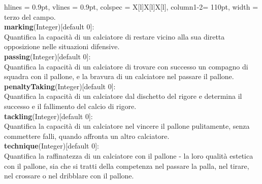 \begin{tblr}{
    hlines = {0.9pt}, vlines = {0.9pt}, colspec = {X[l]X[l]X[l]}, column{1-2}= {110pt},
    width = \textwidth
}
{			terzo del campo.\\
		\medskip\textbf{marking}(Integer)[default 0]:\\
			Quantifica la capacità di un calciatore
			di restare vicino alla sua diretta opposizione
			nelle situazioni difensive.\\
		\medskip\textbf{passing}(Integer)[default 0]:\\
			Quantifica la capacità di un calciatore di trovare
			con successo un compagno di squadra con il pallone,
			e la bravura di un calciatore nel passare il pallone.\\
		\medskip\textbf{penaltyTaking}(Integer)[default 0]:\\
			Quantifica la capacità di un calciatore
			dal dischetto del rigore e determina
			il successo e il fallimento del calcio di rigore.\\
		\medskip\textbf{tackling}(Integer)[default 0]:\\
			Quantifica la capacità di un calciatore nel vincere
			il pallone pulitamente, senza commettere falli,
			quando affronta un altro calciatore.\\
		\medskip\textbf{technique}(Integer)[default 0]:\\
			Quantifica la raffinatezza di un calciatore con
			il pallone - la loro qualità estetica con il pallone,
			sia che si tratti della competenza
			nel passare la palla, nel tirare, nel crossare o
			nel dribblare con il pallone.
	}
	\\
\end{tblr}


\newpage



